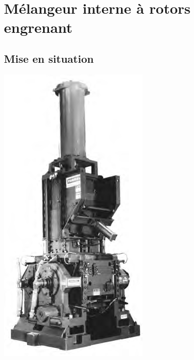 \documentclass[10pt,fleqn]{article} %
\begin{document}
\section{Mélangeur interne à rotors engrenant}
\subsection{Mise en situation}


\begin{minipage}[c]{.3\linewidth}
\begin{center}
\includegraphics[width=.7\linewidth]{images/e3a_10}
\end{center}
\end{minipage}  \hfill
\end{document}
